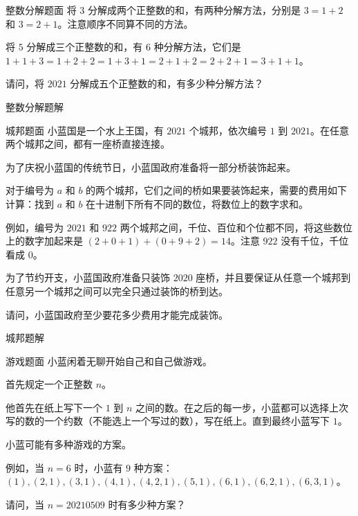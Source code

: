\documentclass{pptt}
\begin{document}
\begin{frame}{整数分解}{题面}
    将 $3$ 分解成两个正整数的和，有两种分解方法，分别是 $3=1+2$ 和 $3=2+1$。注意顺序不同算不同的方法。

    将 $5$ 分解成三个正整数的和，有 $6$ 种分解方法，它们是 $1+1+3 = 1+2+2 = 1+3+1 = 2+1+2 = 2+2+1 = 3+1+1$。

    请问，将 $2021$ 分解成五个正整数的和，有多少种分解方法？
\end{frame}

\begin{frame}{整数分解}{题解}
\end{frame}

\begin{frame}{城邦}{题面}
    小蓝国是一个水上王国，有 $2021$ 个城邦，依次编号 $1$ 到 $2021$。在任意两个城邦之间，都有一座桥直接连接。

    为了庆祝小蓝国的传统节日，小蓝国政府准备将一部分桥装饰起来。

    对于编号为 $a$ 和 $b$ 的两个城邦，它们之间的桥如果要装饰起来，需要的费用如下计算：找到 $a$ 和 $b$ 在十进制下所有不同的数位，将数位上的数字求和。

    例如，编号为 $2021$ 和 $922$ 两个城邦之间，千位、百位和个位都不同，将这些数位上的数字加起来是 $(2+0+1)+(0+9+2)=14$。注意 $922$ 没有千位，千位看成 $0$。

    为了节约开支，小蓝国政府准备只装饰 $2020$ 座桥，并且要保证从任意一个城邦到任意另一个城邦之间可以完全只通过装饰的桥到达。

    请问，小蓝国政府至少要花多少费用才能完成装饰。
\end{frame}

\begin{frame}{城邦}{题解}
\end{frame}

\begin{frame}{游戏}{题面}
    小蓝闲着无聊开始自己和自己做游戏。

    首先规定一个正整数 $n$。

    他首先在纸上写下一个 $1$ 到 $n$ 之间的数。在之后的每一步，小蓝都可以选择上次写的数的一个约数（不能选上一个写过的数），写在纸上。直到最终小蓝写下 $1$。

    小蓝可能有多种游戏的方案。

    例如，当 $n=6$ 时，小蓝有 $9$ 种方案：$(1), (2,1), (3,1), (4,1), (4,2,1), (5,1),(6,1), (6,2,1), (6,3,1)$。

    请问，当 $n=20210509$ 时有多少种方案？
\end{frame}
\end{document}
